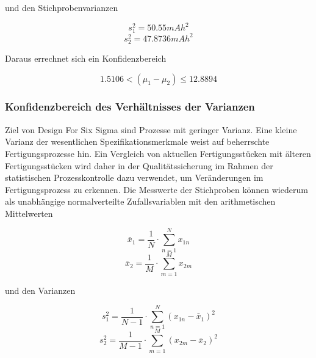 \noindent und den Stichprobenvarianzen

\begin{equation}\label{eq:fiveninetysix}
s_{1}^{2} = 50.55 mAh^{2}
\end{equation}
\begin{equation}\label{eq:fiveninetyseven}
s_{2}^{2} = 47.8736 mAh^{2}
\end{equation}

\noindent Daraus errechnet sich ein Konfidenzbereich

\begin{equation}\label{eq:fiveninetyeight}
1.5106<(\mu _{1} -\mu _{2})\le 12.8894
\end{equation}

\subsubsection{Konfidenzbereich des Verh\"{a}ltnisses der Varianzen}

\noindent Ziel von Design For Six Sigma sind Prozesse mit geringer Varianz. Eine kleine Varianz der wesentlichen Spezifikationsmerkmale weist auf beherrschte Fertigungsprozesse hin. Ein Vergleich von aktuellen Fertigungsst\"{u}cken mit \"{a}lteren Fertigungsst\"{u}cken wird daher in der Qualit\"{a}tssicherung im Rahmen der statistischen Prozesskontrolle dazu verwendet, um Ver\"{a}nderungen im Fertigungsprozess zu erkennen. Die Messwerte der Stichproben k\"{o}nnen wiederum als unabh\"{a}ngige normalverteilte Zufallsvariablen mit den arithmetischen Mittelwerten

\begin{equation}\label{eq:fiveninetynine}
\bar{x}_{1} =\dfrac{1}{N} \cdot \sum _{n=1}^{N}x_{1n}
\end{equation}
\begin{equation}\label{eq:fivehundred}
\bar{x}_{2} =\dfrac{1}{M} \cdot \sum _{m=1}^{M}x_{2m}
\end{equation}

\noindent und den Varianzen

\begin{equation}\label{eq:fivehundredone}
s_{1}^{2} =\dfrac{1}{N-1} \cdot \sum _{n=1}^{N}\left(x_{1n} -\bar{x}_{1} \right)^{2}
\end{equation}
\begin{equation}\label{eq:fivehundredtwo}
s_{2}^{2} =\dfrac{1}{M-1} \cdot \sum _{m=1}^{M}\left(x_{2m} -\bar{x}_{2} \right)^{2}
\end{equation}

